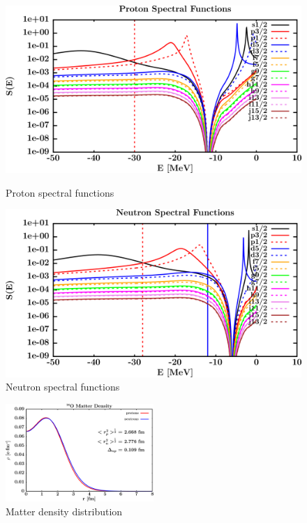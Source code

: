 \begin{figure}[H]
    \centering
    \begin{minipage}{0.45\textwidth}
        \centering
        \includegraphics[width=1.0\textwidth]{figures/o18_protonSpectralFunctions.png}
        \caption{Proton spectral functions}
        \label{DOMFitData_o18_proton_spectralFunctions}
    \end{minipage}\hfill
    \begin{minipage}{0.45\textwidth}
        \centering
        \includegraphics[width=1.0\textwidth]{figures/o18_neutronSpectralFunctions.png}
        \caption{Neutron spectral functions}
        \label{DOMFitData_o18_neutron_spectralFunctions}
    \end{minipage}
\end{figure}

\begin{figure}[H]
    \centering
    \includegraphics[width = 0.5\textwidth]{figures/o18_matterDensity.png}
    \caption{Matter density distribution}
    \label{DOMFitData_o18_matterDensity}
\end{figure}


